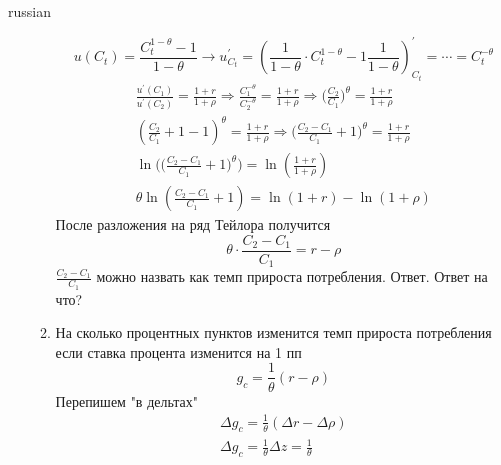 \documentclass{article}
\begin{document}
\begin{otherlanguage*}{russian}
\begin{enumerate}
\begin{enumerate}
\begin{equation}
u(C_t)  = \frac{C^{1 - \theta}_t - 1}{1 - \theta} \rightarrow u^{'}_{C_t} =( \frac{1}{1 - \theta} \cdot C^{1 - \theta}_t - 1 \frac{1}{1 - \theta})^{'}_{C_t} = \cdots = C_t^{- \theta} 
\end{equation}
\begin{align}
\frac{u^{'}(C_1)}{u^{'}(C_2)} = \frac{1 + r}{1 + \rho} \Rightarrow \frac{C_1^{-\theta}}{C_2^{-\theta}} = \frac{1 + r}{1 + \rho} \Rightarrow \Big( \frac{C_2}{C_1}\Big)^\theta = \frac{1 + r}{1 + \rho} \\
(\frac{C_2}{C_1} + 1 - 1)^\theta = \frac{1 + r}{1 + \rho} \Rightarrow \Big( \frac{C_2 - C_1}{C_1} + 1 \Big)^\theta = \frac{1 + r}{1 + \rho} \\
\ln \Big(\Big( \frac{C_2 - C_1}{C_1} + 1 \Big)^\theta \Big)= \ln (\frac{1 + r}{1 + \rho}) \\
\theta \ln (\frac{C_2 - C_1}{C_1} + 1) = \ln ( 1+ r) - \ln (1 + \rho) 
\end{align}
После разложения на ряд Тейлора получится 
\begin{equation}
\theta \cdot \frac{C_2 - C_1}{C_1} = r - \rho 
\end{equation}
$ \frac{C_2 - C_1}{C_1} $ можно назвать как темп прироста потребления. Ответ. Ответ на что? 
\item На сколько процентных пунктов изменится темп прироста потребления если ставка процента изменится на 1 пп 
\begin{equation}
g_c = \frac{1}{\theta} (r - \rho ) 
\end{equation}
Перепишем "в дельтах"
\begin{align}
\Delta g_c = \frac{1}{\theta} ( \Delta r - \Delta \rho) \\
\Delta g_c = \frac{1}{\theta} \Delta z = \frac{1}{\theta}
\end{align}
\end{enumerate}
\end{enumerate}
\end{otherlanguage*} 
\end{document}
